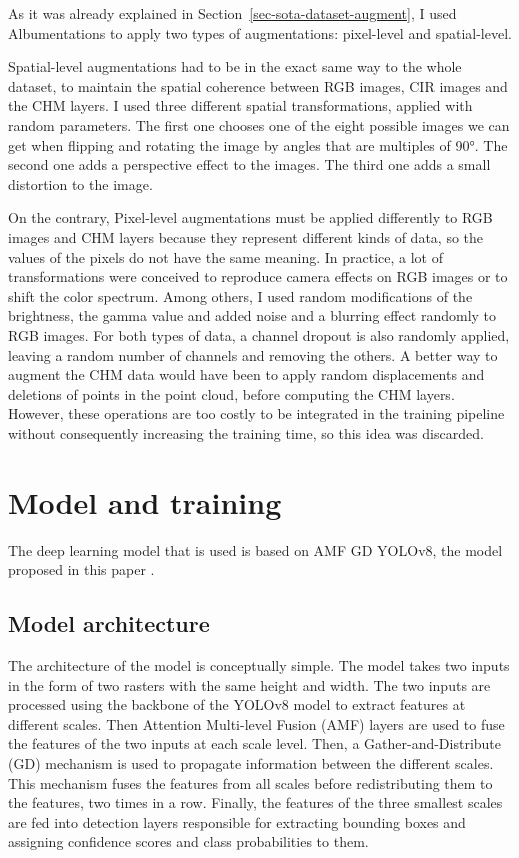 \documentclass[
]{report}
\begin{document}
As it was already explained in Section~\ref{sec-sota-dataset-augment}, I
used Albumentations \autocite{albumentations} to apply two types of
augmentations: pixel-level and spatial-level.

Spatial-level augmentations had to be in the exact same way to the whole
dataset, to maintain the spatial coherence between RGB images, CIR
images and the CHM layers. I used three different spatial
transformations, applied with random parameters. The first one chooses
one of the eight possible images we can get when flipping and rotating
the image by angles that are multiples of 90°. The second one adds a
perspective effect to the images. The third one adds a small distortion
to the image.

On the contrary, Pixel-level augmentations must be applied differently
to RGB images and CHM layers because they represent different kinds of
data, so the values of the pixels do not have the same meaning. In
practice, a lot of transformations were conceived to reproduce camera
effects on RGB images or to shift the color spectrum. Among others, I
used random modifications of the brightness, the gamma value and added
noise and a blurring effect randomly to RGB images. For both types of
data, a channel dropout is also randomly applied, leaving a random
number of channels and removing the others. A better way to augment the
CHM data would have been to apply random displacements and deletions of
points in the point cloud, before computing the CHM layers. However,
these operations are too costly to be integrated in the training
pipeline without consequently increasing the training time, so this idea
was discarded.

\chapter{Model and training}\label{model-and-training}

The deep learning model that is used is based on AMF GD YOLOv8, the
model proposed in this paper \autocite{amf_gd_yolov8}.

\section{Model architecture}\label{model-architecture}

The architecture of the model is conceptually simple. The model takes
two inputs in the form of two rasters with the same height and width.
The two inputs are processed using the backbone of the YOLOv8 model
\autocite{yolo} to extract features at different scales. Then Attention
Multi-level Fusion (AMF) layers are used to fuse the features of the two
inputs at each scale level. Then, a Gather-and-Distribute (GD) mechanism
is used to propagate information between the different scales. This
mechanism fuses the features from all scales before redistributing them
to the features, two times in a row. Finally, the features of the three
smallest scales are fed into detection layers responsible for extracting
bounding boxes and assigning confidence scores and class probabilities
to them.
\end{document}
